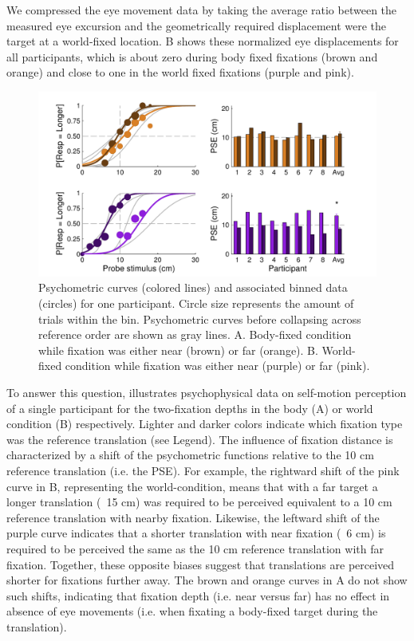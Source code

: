 We compressed the eye movement data by taking the average ratio between the measured eye excursion and the geometrically required displacement were the target at a world-fixed location. B shows these normalized eye displacements for all participants, which is about zero during body fixed fixations (brown and orange) and close to one in the world fixed fixations (purple and pink).  


\begin{figure}
    \includegraphics[width=1.0\textwidth]{src/paper4/p4_figure3.pdf}

	\caption{Psychometric curves (colored lines) and associated binned data (circles) for one participant. Circle size represents the amount of trials within the bin. Psychometric curves before collapsing across reference order are shown as gray lines. A.  Body-fixed condition while fixation was either near (brown) or far (orange). B. World-fixed condition while fixation was either near (purple) or far (pink).}
	\label{p4:fig3}
\end{figure}

To answer this question,  illustrates psychophysical data on self-motion perception of a single participant for the two-fixation depths in the body (A) or world condition (B) respectively. Lighter and darker colors indicate which fixation type was the reference translation (see Legend). The influence of fixation distance is characterized by a shift of the psychometric functions relative to the 10 \si{\centi\metre} reference translation (i.e. the PSE). For example, the rightward shift of the pink curve in B, representing the world-condition, means that with a far target a longer translation (~15 \si{\centi\metre}) was required to be perceived equivalent to a 10 \si{\centi\metre} reference translation with nearby fixation. Likewise, the leftward shift of the purple curve indicates that a shorter translation with near fixation (~6 \si{\centi\metre}) is required to be perceived the same as the 10 \si{\centi\metre} reference translation with far fixation. Together, these opposite biases suggest that translations are perceived shorter for fixations further away. The brown and orange curves in A do not show such shifts, indicating that fixation depth (i.e. near versus far) has no effect in absence of eye movements (i.e. when fixating a body-fixed target during the translation).


